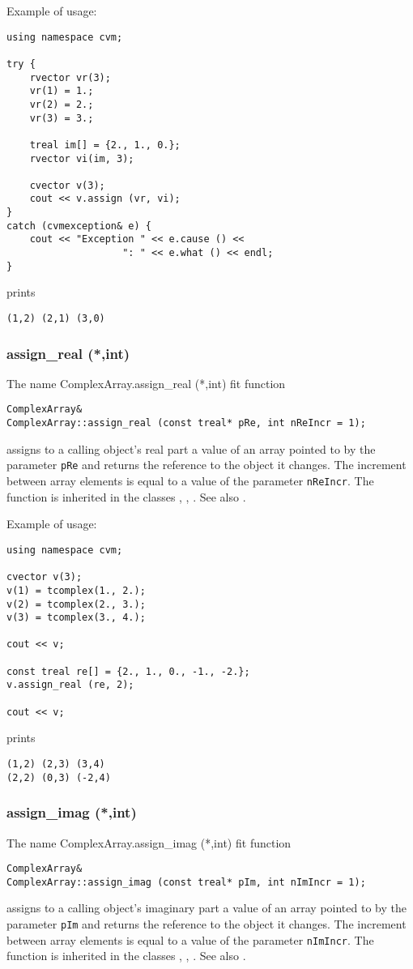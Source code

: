Example of usage:
\begin{verbatim}
using namespace cvm;

try {
    rvector vr(3);
    vr(1) = 1.;
    vr(2) = 2.;
    vr(3) = 3.;

    treal im[] = {2., 1., 0.};
    rvector vi(im, 3);

    cvector v(3);
    cout << v.assign (vr, vi);
}
catch (cvmexception& e) {
    cout << "Exception " << e.cause () <<
                    ": " << e.what () << endl;
}
\end{verbatim}
prints
\begin{verbatim}
(1,2) (2,1) (3,0)
\end{verbatim}
\newpage




\subsubsection{assign\_real (*,int)}
The%
\pdfdest name {ComplexArray.assign_real (*,int)} fit{ }
function
\begin{verbatim}
ComplexArray&
ComplexArray::assign_real (const treal* pRe, int nReIncr = 1);
\end{verbatim}
assigns to a calling object's real part
a value of an array pointed to by the parameter
\verb"pRe" and returns the reference to
the object it changes. The increment between array elements
is equal to a value of the parameter \verb"nReIncr".
The function is inherited in the classes
,
,
.
See also .

Example of usage:
\begin{verbatim}
using namespace cvm;

cvector v(3);
v(1) = tcomplex(1., 2.);
v(2) = tcomplex(2., 3.);
v(3) = tcomplex(3., 4.);

cout << v;

const treal re[] = {2., 1., 0., -1., -2.};
v.assign_real (re, 2);

cout << v;
\end{verbatim}
prints
\begin{verbatim}
(1,2) (2,3) (3,4)
(2,2) (0,3) (-2,4)
\end{verbatim}
\newpage




\subsubsection{assign\_imag (*,int)}
The%
\pdfdest name {ComplexArray.assign_imag (*,int)} fit{ }
function
\begin{verbatim}
ComplexArray&
ComplexArray::assign_imag (const treal* pIm, int nImIncr = 1);
\end{verbatim}
assigns to a calling object's imaginary part
a value of an array pointed to by the parameter
\verb"pIm" and returns the reference to
the object it changes. The increment between array elements
is equal to a value of the parameter \verb"nImIncr".
The function is inherited in the classes
,
,
.
See also .

